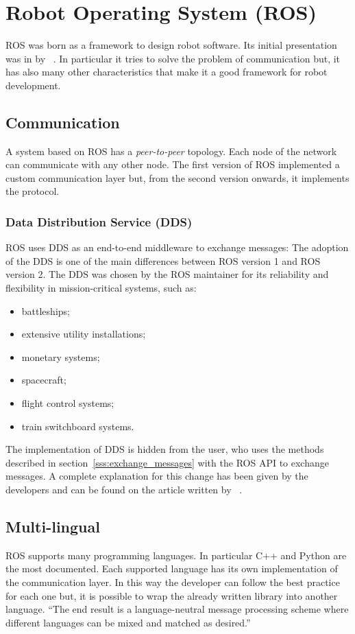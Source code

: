 \documentclass[../thesis.tex]{subfiles}
\begin{document}
\section{Robot Operating System (ROS)}
\acrshort{ROS} was born as a framework to design robot software. Its initial presentation was in \citeyear{paper:ros} by \citeauthor{paper:ros}~\cite{paper:ros}. In particular it tries to solve the problem of communication but, it has also many other characteristics that make it a good framework for robot development.
\subsection{Communication}
A system based on \acrshort{ROS} has a \textit{peer-to-peer} topology. Each node of the network can communicate with any other node. The first version of \acrshort{ROS} implemented a custom communication layer but, from the second version onwards, it implements the  protocol.
\subsubsection{Data Distribution Service (DDS)}
\gls{ROS} uses \gls{DDS} as an end-to-end middleware to exchange messages: The adoption of the \gls{DDS} is one of the main differences between \gls{ROS} version 1 and \gls{ROS} version 2. The \gls{DDS} was chosen by the \gls{ROS} maintainer for its reliability and flexibility in mission-critical systems, such as:
\begin{itemize}
    \item battleships;
    \item extensive utility installations;
    \item monetary systems;
    \item spacecraft;
    \item flight control systems;
    \item train switchboard systems.
\end{itemize}
The implementation of \gls{DDS} is hidden from the user, who uses the methods described in section~\ref{sss:exchange_messages} with the \gls{ROS} API to exchange messages. A complete explanation for this change has been given by the developers and can be found on the article written by \citeauthor{site:ros_dds}~\cite{site:ros_dds}.

\subsection{Multi-lingual}
\gls{ROS} supports many programming languages. In particular C++ and Python are the most documented. Each supported language has its own implementation of the communication layer. In this way the developer can follow the best practice for each one but, it is possible to wrap the already written library into another language. ``The end result is a language-neutral message processing scheme where different languages can be mixed and matched as desired.''~\cite{paper:ros}
\end{document}
